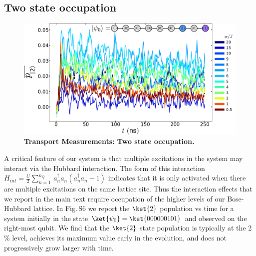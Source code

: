 \subsection{Two state occupation}
\begin{figure}[tbh]
    \centering
    \includegraphics[width=150mm, keepaspectratio]{./PDF/fs6_190919_1238p.pdf}
    \caption{\textbf{Transport Measurements:  Two state occupation.}
    }\end{figure}
    A critical feature of our system is that multiple excitations in the system may interact via the Hubbard interaction.
    The form of this interaction
    $H_{int} = \frac{U}{2}\sum\limits_{n=1}^{n_{Q}} \,a^{\dagger}_{n}a_n(a^{\dagger}_{n}a_n-1)$
    indicates that it is only activated when there are multiple excitations on the same lattice site.
    Thus the interaction effects that we report in the main text require occupation of the higher levels of our Bose-Hubbard lattice.
    In Fig.\,S6 we report the $\ket{2}$ population vs time for a system initially in the state $\ket{\psi_0}=\ket{000000101}$ and observed on the right-most qubit.
    We find that the $\ket{2}$ state population is typically at the 2 \% level,
    achieves its maximum value early in the evolution, and does not progressively grow larger with time.

